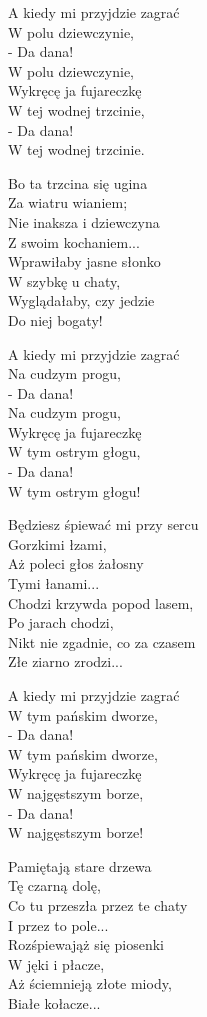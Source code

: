\begin{text}
    \hfill\break
A kiedy mi przyjdzie zagrać\\
W polu dziewczynie,\\
- Da dana!\\
W polu dziewczynie,\\
Wykręcę ja fujareczkę\\
W tej wodnej trzcinie,\\
- Da dana!\\
W tej wodnej trzcinie.

Bo ta trzcina się ugina\\
Za wiatru wianiem;\\
Nie inaksza i dziewczyna\\
Z swoim kochaniem...\\
Wprawiłaby jasne słonko\\
W szybkę u chaty,\\
Wyglądałaby, czy jedzie\\
Do niej bogaty!

A kiedy mi przyjdzie zagrać\\
Na cudzym progu,\\
- Da dana!\\
Na cudzym progu,\\
Wykręcę ja fujareczkę\\
W tym ostrym głogu,\\
- Da dana!\\
W tym ostrym głogu!

Będziesz śpiewać mi przy sercu\\
Gorzkimi łzami,\\
Aż poleci głos żałosny\\
Tymi łanami...\\
Chodzi krzywda popod lasem,\\
Po jarach chodzi,\\
Nikt nie zgadnie, co za czasem\\
Złe ziarno zrodzi...

A kiedy mi przyjdzie zagrać\\
W tym pańskim dworze,\\
- Da dana!\\
W tym pańskim dworze,\\
Wykręcę ja fujareczkę\\
W najgęstszym borze,\\
- Da dana!\\
W najgęstszym borze!

Pamiętają stare drzewa\\
Tę czarną dolę,\\
Co tu przeszła przez te chaty\\
I przez to pole...\\
Rozśpiewająż się piosenki\\
W jęki i płacze,\\
Aż ściemnieją złote miody,\\
Białe kołacze...
\end{text}
